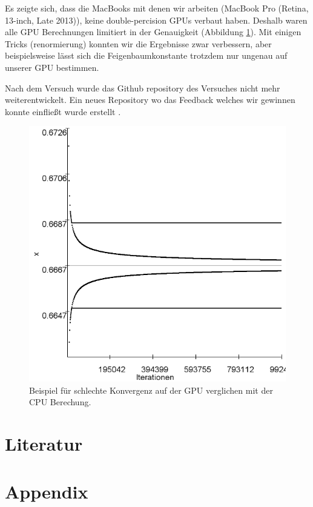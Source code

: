 \documentclass[12pt,a4paper]{article}
\begin{document}
Es zeigte sich, dass die MacBooks mit denen wir arbeiten (MacBook Pro (Retina, 13-inch, Late 2013)), keine double-percision GPUs verbaut haben. Deshalb waren alle GPU Berechnungen limitiert in der Genauigkeit (Abbildung \ref{fig:bsp-opencl}). 
Mit einigen Tricks (renormierung) konnten wir die Ergebnisse zwar verbessern, aber beispielsweise lässt sich die Feigenbaumkonstante trotzdem nur ungenau auf unserer GPU bestimmen.

Nach dem Versuch wurde das Github repository des Versuches nicht mehr weiterentwickelt. Ein neues Repository wo das Feedback welches wir gewinnen konnte einfließt wurde erstellt \parencite{github-future}. 

\begin{figure}[!htbp]
\centering
\includegraphics[scale=0.25]{log-konv-r3}
\caption{Beispiel für schlechte Konvergenz auf der GPU verglichen mit der CPU Berechung.}
\label{fig:bsp-opencl}
\end{figure}



\section{ Literatur }
\nocite{*}
\printbibliography
\pagebreak
\section{Appendix}
\end{document}
